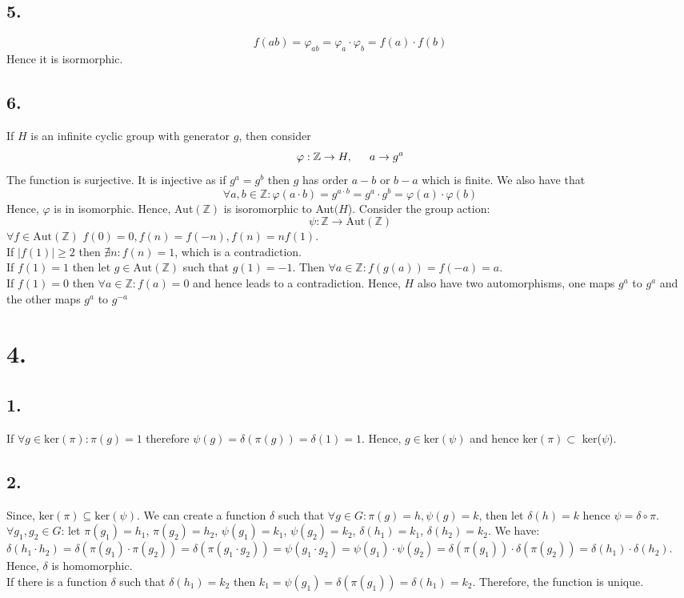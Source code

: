 \documentclass[11pt]{article}
\begin{document}
\subsection*{5.}
\[
f(ab) = \varphi_{ab} = \varphi_a \cdot \varphi_b = f(a) \cdot f(b)
\]
Hence it is isormorphic.
\subsection*{6.}
If $H$ is an infinite cyclic group with generator $g$, then consider
\[
\varphi: \mathbb{Z} \to H, \indent a \to g^a
\]
The function is surjective. It is injective as if $g^a = g^b$ then $g$ has order $a-b$ or $b-a$ which is finite. We also have that \\
\[
\forall a,b \in \mathbb{Z}: \varphi(a\cdot b) = g^{a\cdot b} = g^a \cdot g^b = \varphi(a) \cdot \varphi(b)
\]
Hence, $\varphi$ is in isomorphic. Hence, Aut$(\mathbb{Z})$ is isoromorphic to Aut$(H$).
Consider the group action:
\[
\psi: \mathbb{Z} \to \text{Aut}(\mathbb{Z})
\]
$\forall f \in \text{Aut}(\mathbb{Z})$ $f(0) = 0, f(n) = f(-n), f(n) = nf(1)$. \\
If $|f(1)| \ge 2$ then $\nexists n: f(n) = 1$, which is a contradiction. \\
If $f(1) = 1$ then let $g \in \text{Aut}(\mathbb{Z})$ such that $g(1) = -1$. Then $\forall a \in \mathbb{Z}: f(g(a)) = f(-a) = a$. \\
If $f(1) = 0$ then $\forall a \in \mathbb{Z}: f(a) = 0$ and hence leads to a contradiction.
Hence, $H$ also have two automorphisms, one maps $g^a$ to $g^a$ and the other maps $g^a$ to $g^{-a}$
\pagebreak
\section*{4.}
\subsection*{1.}
If $\forall g \in \text{ker}(\pi): \pi(g) = 1$ therefore $\psi(g) = \delta(\pi(g)) = \delta(1) = 1$. Hence, $g \in \text{ker}(\psi)$ and hence ker$(\pi) \subset $ ker($\psi$).
\subsection*{2.}
Since, ker$(\pi) \subseteq \text{ker}(\psi)$. We can create a function $\delta$ such that $\forall g \in G:\pi(g) = h, \psi(g) = k$, then let $\delta(h) = k$ hence $\psi = \delta \circ \pi$. \\
$\forall g_1,g_2 \in G$: let $\pi(g_1) = h_1$, $\pi(g_2) = h_2$, $\psi(g_1) = k_1$, $\psi(g_2) = k_2$, $\delta(h_1) = k_1$, $\delta(h_2) = k_2$. We have: \\
$\delta(h_1 \cdot h_2) = \delta(\pi(g_1) \cdot \pi(g_2)) = \delta(\pi(g_1 \cdot g_2)) = \psi(g_1 \cdot g_2) = \psi(g_1) \cdot \psi(g_2) = \delta(\pi(g_1)) \cdot \delta(\pi(g_2)) = \delta(h_1) \cdot \delta(h_2)$. 
Hence, $\delta$ is homomorphic.\\ 
If there is a function $\delta$ such that $\delta(h_1) = k_2$ then $k_1 = \psi(g_1) = \delta(\pi(g_1)) = \delta(h_1) = k_2$. Therefore, the function is unique.
\end{document}
